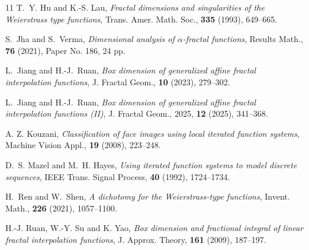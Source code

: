 \documentclass[11pt]{amsart}
\theoremstyle{definition}
\theoremstyle{remark}
\numberwithin{equation}{section}
\begin{document}
\begin{thebibliography}{11}
 {\sc T.~Y. Hu and K.-S. Lau}, {\em Fractal dimensions and singularities of the Weierstrass type
functions}, Trans. Amer. Math. Soc., {\bf 335} (1993), 649--665.



 {\sc S.~Jha and S.~Verma}, {\em Dimensional analysis of $\alpha$-fractal functions}, Results Math., {\bf 76} (2021), Paper No. 186, 24 pp.


 {\sc L.~Jiang and H.-J.~Ruan}, {\em Box dimension of generalized affine fractal interpolation functions}, J. Fractal Geom., {\bf 10} (2023), 279--302.


 {\sc L.~Jiang and H.-J.~Ruan}, {\em Box dimension of generalized affine fractal interpolation functions (II)}, J. Fractal Geom., 2025, {\bf 12} (2025), 341--368.




 {\sc A. Z. Kouzani}, {\em Classification of face images using local iterated function systems}, Machine Vision Appl., {\bf 19} (2008), 223--248. 



 {\sc D.~S. Mazel and M.~H. Hayes}, {\em Using iterated function systems to model discrete sequences}, IEEE Trans. Signal Process, {\bf 40} (1992), 1724--1734.

 {\sc H.~Ren and W.~Shen}, {\em A dichotomy for the Weierstrass-type functions}, Invent. Math., {\bf 226} (2021), 1057--1100.

 {\sc H.-J. Ruan, W.-Y. Su and K. Yao}, {\em Box dimension and fractional integral of linear fractal interpolation functions}, J. Approx. Theory, {\bf 161} (2009), 187--197.


\end{thebibliography}
\end{document}
